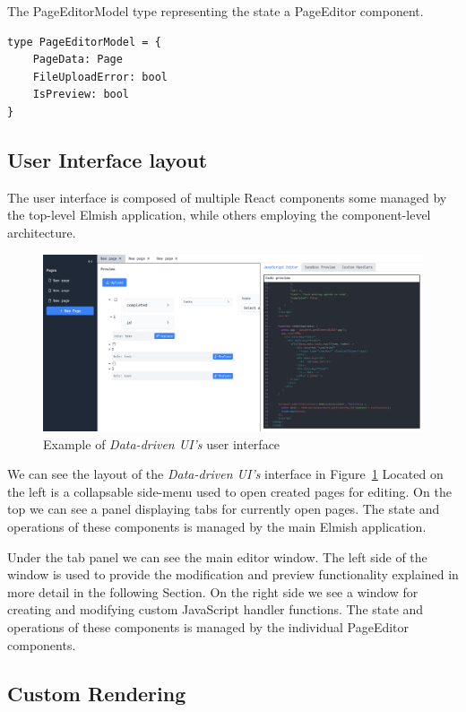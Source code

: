 \begin{listing}[htbp]
	\caption{The PageEditorModel type representing the state a PageEditor component.}
	\label{fig:editorModel}
	\begin{lstlisting}
type PageEditorModel = {
    PageData: Page
    FileUploadError: bool
    IsPreview: bool
}
    \end{lstlisting}
\end{listing}

\subsection{User Interface layout}



The user interface is composed of multiple React components some managed by the top-level Elmish application, while others employing the
component-level architecture.
\begin{figure}[htbp]
	\centering
	\includegraphics[width=1\linewidth]{img/UIExample.pdf}
	\caption{Example of \emph{Data-driven UI's} user interface}
	\label{fig:ui}
\end{figure}
We can see the layout of the \emph{Data-driven UI's} interface in Figure~\ref{fig:ui}
Located on the left is a collapsable side-menu used to open created pages for editing.
On the top we can see a panel displaying tabs for currently open pages.
The state and operations of these components is managed by the main Elmish application.

Under the tab panel we can see the main editor window.
The left side of the window is used to provide the modification and preview functionality explained in more detail in the following Section.
On the right side we see a window for creating and modifying custom JavaScript handler functions.
The state and operations of these components is managed by the individual PageEditor components.

\subsection{Custom Rendering}

